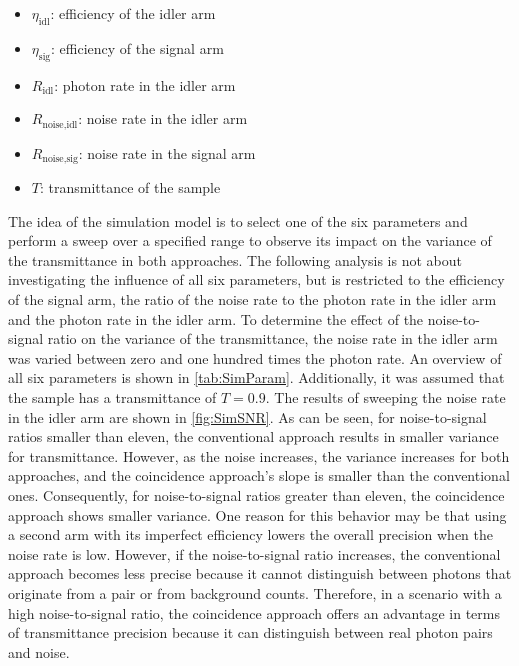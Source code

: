 \begin{itemize}[topsep=0pt, partopsep=0pt, itemsep=1.5pt, parsep=0pt, leftmargin=3em]
	\item $\eta_{\text{idl}}$: efficiency of the idler arm
	\item $\eta_{\text{sig}}$: efficiency of the signal arm
	\item $R_{\text{idl}}$: photon rate in the idler arm
	\item $R_{\text{noise,idl}}$: noise rate in the idler arm
	\item $R_{\text{noise,sig}}$: noise rate in the signal arm
	\item $T$: transmittance of the sample 
\end{itemize}
The idea of the simulation model is to select one of the six parameters and perform a sweep over a specified range to observe its impact on the variance of the transmittance in both approaches. The following analysis is not about investigating the influence of all six parameters, but is restricted to the efficiency of the signal arm, the ratio of the noise rate to the photon rate in the idler arm and the photon rate in the idler arm. \newline
To determine the effect of the noise-to-signal ratio on the variance of the transmittance, the noise rate in the idler arm was varied between zero and one hundred times the photon rate. An overview of all six parameters is shown in \autoref{tab:SimParam}. Additionally, it was assumed that the sample has a transmittance of $T=0.9$.\newline
The results of sweeping the noise rate in the idler arm are shown in \autoref{fig:SimSNR}. As can be seen, for noise-to-signal ratios smaller than eleven, the conventional approach results in smaller variance for transmittance. However, as the noise increases, the variance increases for both approaches, and the coincidence approach's slope is smaller than the conventional ones. Consequently, for noise-to-signal ratios greater than eleven, the coincidence approach shows smaller variance. One reason for this behavior may be that using a second arm with its imperfect efficiency lowers the overall precision when the noise rate is low. However, if the noise-to-signal ratio increases, the conventional approach becomes less precise because it cannot distinguish between photons that originate from a pair or from background counts. Therefore, in a scenario with a high noise-to-signal ratio, the coincidence approach offers an advantage in terms of transmittance precision because it can distinguish between real photon pairs and noise.
